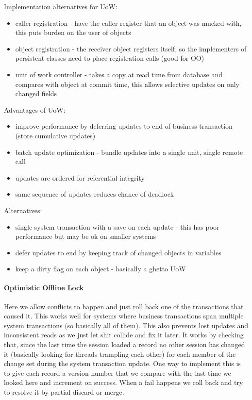 \documentclass{article}
\begin{document}
Implementation alternatives for UoW:
\begin{itemize}
    \item caller registration - have the caller register that an object was mucked with, this puts burden on the user of objects
    \item object registration - the receiver object registers itself, so the implementers of persistent classes need to place registration calls (good for OO)
    \item unit of work controller - takes a copy at read time from database and compares with object at commit time, this allows selective updates on only changed fields
\end{itemize}

Advantages of UoW:
\begin{itemize}
    \item improve performance by deferring updates to end of business transaction (store cumulative updates)
    \item batch update optimization - bundle updates into a single unit, single remote call
    \item updates are ordered for referential integrity
    \item same sequence of updates reduces chance of deadlock
\end{itemize}

Alternatives:
\begin{itemize}
    \item single system transaction with a save on each update - this has poor performance but may be ok on smaller systems
    \item defer updates to end by keeping track of changed objects in variables
    \item keep a dirty flag on each object - basically a ghetto UoW
\end{itemize}

\paragraph{Optimistic Offline Lock} %
\label{par:optimistic_offline_lock}
Here we allow conflicts to happen and just roll back one of the transactions that caused it. This works well for systems where business transactions span multiple system transactions (so basically all of them). This also prevents lost updates and inconsistent reads as we just let shit collide and fix it later. It works by checking that, since the last time the session loaded a record no other session has changed it (basically looking for threads trampling each other) for each member of the change set during the system transaction update. One way to implement this is to give each record a version number that we compare with the last time we looked here and increment on success. When a fail happens we roll back and try to resolve it by partial discard or merge.
\end{document}
